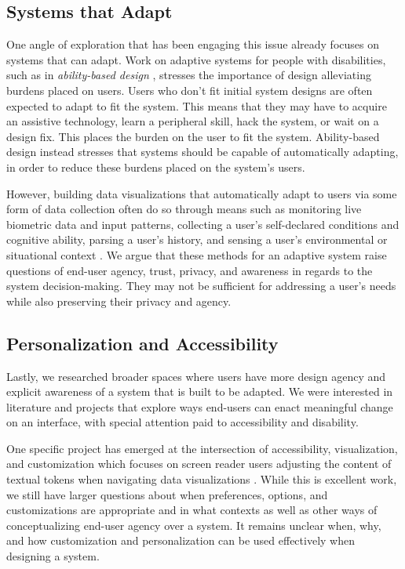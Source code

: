 \subsection{Systems that Adapt}

One angle of exploration that has been engaging this issue already focuses on systems that can adapt. Work on adaptive systems for people with disabilities, such as in \textit{ability-based design} \cite{Wobbrock2011}, stresses the importance of design alleviating burdens placed on users. Users who don't fit initial system designs are often expected to adapt to fit the system. This means that they may have to acquire an assistive technology, learn a peripheral skill, hack the system, or wait on a design fix. This places the burden on the user to fit the system. Ability-based design instead stresses that systems should be capable of automatically adapting, in order to reduce these burdens placed on the system's users. 

However, building data visualizations that automatically adapt to users via some form of data collection often do so through means such as monitoring live biometric data and input patterns, collecting a user's self-declared conditions and cognitive ability, parsing a user's history, and sensing a user's environmental or situational context \cite{Yanez}. We argue that these methods for an adaptive system raise questions of end-user agency, trust, privacy, and awareness in regards to the system decision-making. They may not be sufficient for addressing a user's needs while also preserving their privacy and agency.


\subsection{Personalization and Accessibility}
Lastly, we researched broader spaces where users have more design agency and explicit awareness of a system that is built to be adapted. We were interested in literature and projects that explore ways end-users can enact meaningful change on an interface, with special attention paid to accessibility and disability.

One specific project has emerged at the intersection of accessibility, visualization, and customization which focuses on screen reader users adjusting the content of textual tokens when navigating data visualizations \cite{Jones}. While this is excellent work, we still have larger questions about when preferences, options, and customizations are appropriate and in what contexts as well as other ways of conceptualizing end-user agency over a system. It remains unclear when, why, and how customization and personalization can be used effectively when designing a system.

